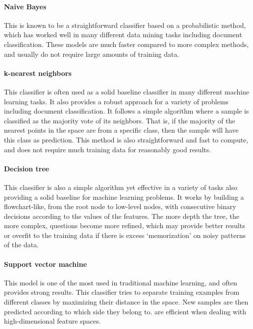 \paragraph{Naive Bayes}

This is known to be a straightforward classifier based on a probabilistic method, which has worked well in many different data mining tasks including document classification.
These models are much faster compared to more complex methods, and usually do not require large amounts of training data.


\paragraph{k-nearest neighbors}

This classifier is often used as a solid baseline classifier in many different machine learning tasks.
It also provides a robust approach for a variety of  problems including document classification.
It follows a simple algorithm where a sample is classified as the majority vote of its neighbors.
That is, if the majority of the nearest points in the space are from a specific class, then the sample will have this class as prediction.
This method is also straightforward and fast to compute, and does not require much training data for reasonably good results.


\paragraph{Decision tree}

This classifier is also a simple algorithm yet effective in a variety of tasks also providing a solid baseline for machine learning problems.
It works by building a flowchart-like, from the root node to low-level nodes, with consecutive binary decisions according to the values of the features.
The more depth the tree, the more complex, questions become more refined, which may provide better results or overfit to the training data if there is excess `memorization' on noisy patterns of the data.


\paragraph{Support vector machine}

This model is one of the most used in traditional machine learning, and often provides strong results.
This classifier tries to separate training examples from different classes by maximizing their distance in the space.
New samples are then predicted according to which side they belong to.
 are efficient when dealing with high-dimensional feature spaces.


